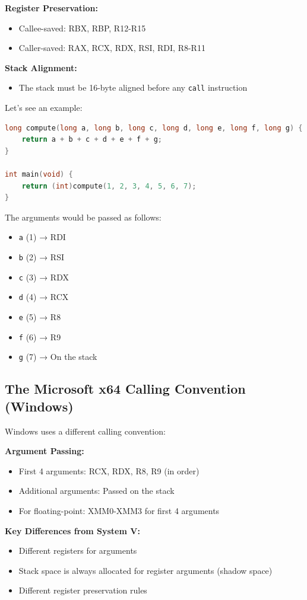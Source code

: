 \textbf{Register Preservation:}
\begin{itemize}
  \item Callee-saved: RBX, RBP, R12-R15
  \item Caller-saved: RAX, RCX, RDX, RSI, RDI, R8-R11
\end{itemize}

\textbf{Stack Alignment:}
\begin{itemize}
  \item The stack must be 16-byte aligned before any \texttt{call} instruction
\end{itemize}

Let's see an example:

\begin{lstlisting}[language=C]
long compute(long a, long b, long c, long d, long e, long f, long g) {
    return a + b + c + d + e + f + g;
}

int main(void) {
    return (int)compute(1, 2, 3, 4, 5, 6, 7);
}
\end{lstlisting}

The arguments would be passed as follows:
\begin{itemize}
  \item \texttt{a} (1) → RDI
  \item \texttt{b} (2) → RSI
  \item \texttt{c} (3) → RDX
  \item \texttt{d} (4) → RCX
  \item \texttt{e} (5) → R8
  \item \texttt{f} (6) → R9
  \item \texttt{g} (7) → On the stack
\end{itemize}

\subsection{The Microsoft x64 Calling Convention (Windows)}

Windows uses a different calling convention:

\textbf{Argument Passing:}
\begin{itemize}
  \item First 4 arguments: RCX, RDX, R8, R9 (in order)
  \item Additional arguments: Passed on the stack
  \item For floating-point: XMM0-XMM3 for first 4 arguments
\end{itemize}

\textbf{Key Differences from System V:}
\begin{itemize}
  \item Different registers for arguments
  \item Stack space is always allocated for register arguments (shadow space)
  \item Different register preservation rules
\end{itemize}

